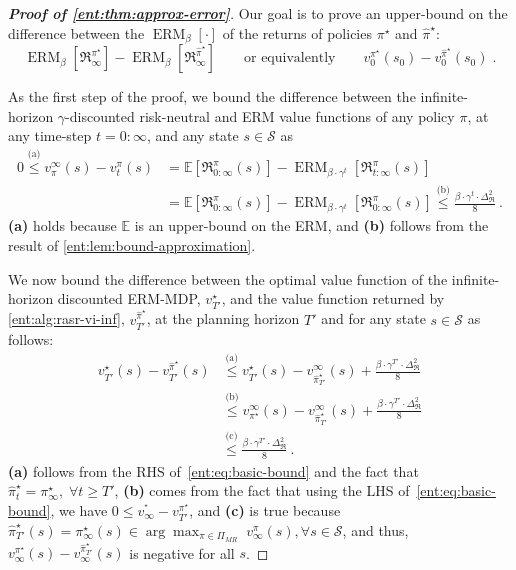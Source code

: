 \documentclass[twoside]{article}
\newcommand{\E}{\mathbb{E}}
\newcommand{\opt}{^\star}
\newcommand{\vspan}{\Delta_{\mathfrak{R}}}
\newcommand{\erm}[2]{\operatorname{ERM}_{#1}\left[#2\right]}
\theoremstyle{plain}
\theoremstyle{definition}
\theoremstyle{remark}
\begin{document}
\begin{proof}[\bf\em Proof of \cref{ent:thm:approx-error}]
Our goal is to prove an upper-bound on the difference between the $\erm{\beta}{\cdot}$ of the returns of policies $\pi^\star$ and $\hat{\pi}\opt$: 
%
\begin{equation*}
\erm{\beta} { \mathfrak{R}_{\infty}^{\pi\opt}  } - 
\erm{\beta} { \mathfrak{R}_{\infty}^{\hat{\pi}\opt}} \qquad \text{or equivalently} \qquad v_0^{\pi^\star}(s_0) - v_0^{\hat{\pi}\opt}(s_0)\;. 
\end{equation*}
%


As the first step of the proof, we bound the difference between the infinite-horizon $\gamma$-discounted risk-neutral and ERM value functions of any policy $\pi$, at any time-step $t = 0{:}\infty$, and any state $s\in\mathcal S$ as
%
\begin{align} \label{ent:eq:basic-bound}
    0 \stackrel{\text{(a)}}{\le} v^{\infty}_{\pi}(s) - v^{\pi }_t(s) &= \E{[\mathfrak{R}^\pi_{0{:}\infty}(s)]} - \erm{\beta\cdot\gamma^t}{\mathfrak{R}^\pi_{t{:}\infty}(s)} \\ 
    &= \E{[\mathfrak{R}^\pi_{0{:}\infty}(s)]} - \erm{\beta\cdot\gamma^t}{\mathfrak{R}^\pi_{0{:}\infty}(s)} \stackrel{\text{(b)}}{\le} \frac{\beta \cdot \gamma^t \cdot \vspan^2}{8}~. \nonumber 
\end{align}
%
{\bf (a)} holds because $\E$ is an upper-bound on the ERM, and {\bf (b)} follows from the result of \cref{ent:lem:bound-approximation}.

We now bound the difference between the optimal value function of the infinite-horizon discounted ERM-MDP, $v\opt_{T'}$, and the value function returned by \cref{ent:alg:rasr-vi-inf}, $v_{T'}^{\hat{\pi}\opt}$, at the planning horizon $T'$ and for any state $s\in\mathcal S$ as follows: 
%
\begin{align*}
  v\opt_{T'} (s)- v_{T'}^{\hat{\pi}\opt}(s) &\stackrel{\text{(a)}}{\le}  v\opt_{T'}(s) - v^{\infty}_{\hat{\pi}^\star_{T'}}(s) + \frac{\beta\cdot \gamma^{T'} \cdot \vspan^2}{8} \\
  &\stackrel{\text{(b)}}{\le} v^{\infty}_{\pi\opt}(s) - v^{\infty}_{\hat{\pi}^\star_{T'}}(s) + \frac{\beta\cdot \gamma^{T'} \cdot \vspan^2}{8} \\
  &\stackrel{\text{(c)}}{\le} \frac{\beta \cdot \gamma^{T'} \cdot \vspan^2}{8}~.
\end{align*}
%
{\bf (a)} follows from the RHS of~\eqref{ent:eq:basic-bound} and the fact that $\hat{\pi}\opt_t = \pi_{\infty}\opt ,\;\forall t\geq T'$, {\bf (b)} comes from the fact that using the LHS of~\eqref{ent:eq:basic-bound}, we have $0 \leq v^{\opt}_{\infty} - v_{T'}^{\pi^\star}$, and {\bf (c)} is true because $\hat{\pi}^\star_{T'}(s) = \pi_{\infty}\opt (s) \in \arg \max_{\pi\in \Pi_{MR}} \; v_{\infty}^{\pi}(s),\forall s\in\mathcal S$, and thus, $v_{\infty}^{\pi\opt}(s) - v_{\infty}^{\hat{\pi}^\star_{T'}}(s)$ is negative for all $s$.


\end{proof}
\end{document}
